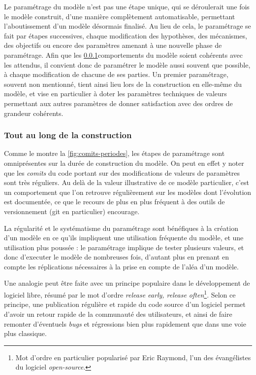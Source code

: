 \documentclass[12pt, a4paper, oneside]{book}
\begin{document}
Le paramétrage du modèle n'est pas une étape unique, qui se déroulerait une fois le modèle construit, d'une manière complètement automatisable, permettant l'aboutissement d'un modèle désormais finalisé.
Au lieu de cela, le paramétrage se fait par étapes successives, chaque modification des hypothèses, des mécanismes, des objectifs ou encore des paramètres amenant à une nouvelle phase de paramétrage.
Afin que les \ref{}comportements du modèle soient cohérents avec les attendus, il convient donc de paramétrer le modèle aussi souvent que possible, à chaque modification de chacune de ses parties.
Un premier paramétrage, souvent non mentionné, tient ainsi lieu lors de la construction en elle-même du modèle, et vise en particulier à doter les paramètres techniques  de valeurs permettant aux autres paramètres de donner satisfaction avec des ordres de grandeur cohérents.

\subsubsection{Tout au long de la construction}

Comme le montre la \cref{fig:comits-periodes}, les étapes de paramétrage sont omniprésentes sur la durée de construction du modèle. On peut en effet y noter que les \textit{comits} du code portant sur des modifications de valeurs de paramètres sont très réguliers.
Au delà de la valeur illustrative de ce modèle particulier, c'est un comportement que l'on retrouve régulièrement sur les modèles dont l'évolution est documentée, ce que le recours de plus en plus fréquent à des outils de versionnement (git en particulier) encourage.

La régularité et le systématisme du paramétrage sont bénéfiques à la création d'un modèle en ce qu'ils impliquent une utilisation fréquente du modèle, et une utilisation plus poussée : le paramétrage implique de tester plusieurs valeurs, et donc d'executer le modèle de nombreuses fois, d'autant plus en prenant en compte les réplications nécessaires à la prise en compte de l'aléa d'un modèle.

Une analogie peut être faite avec un principe populaire dans le développement de logiciel libre, résumé par le mot d'ordre \og \textit{release early, release often}\fg{}\footnote{Mot d'ordre en particulier popularisé par Eric Raymond, l'un des \og évangélistes\fg{} du logiciel \textit{open-source}.}.
Selon ce principe, une publication régulière et rapide du code source d'un logiciel permet d'avoir un retour rapide de la communauté des utilisateurs, et ainsi de faire remonter d'éventuels \textit{bugs} et régressions bien plus rapidement que dans une voie plus classique.
\end{document}
